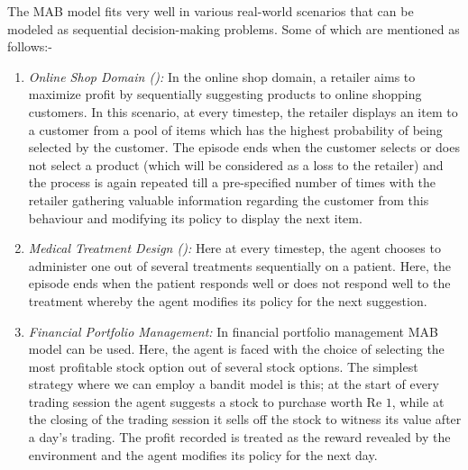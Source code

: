 
The MAB model fits very well in various real-world scenarios that can be modeled as sequential decision-making problems. Some of which are mentioned as follows:-
\begin{enumerate}
\item \emph{Online Shop Domain (\cite{ghavamzadeh2015bayesian}):} In the online shop domain, a retailer aims to maximize profit by sequentially suggesting products to online shopping customers. In this scenario, at every timestep, the retailer displays an item to a customer from a pool of items which has the highest probability of being selected by the customer. The episode ends when the customer selects or does not select a product (which will be considered as a loss to the retailer) and the process is again repeated till a pre-specified number of times with the retailer gathering valuable information regarding the customer from this behaviour and modifying its policy to display the next item.
\item \emph{Medical Treatment Design (\cite{thompson1933likelihood}):} Here at every timestep, the agent chooses to administer one out of several treatments sequentially on a patient. Here, the episode ends when the patient responds well or does not respond well to the treatment whereby the agent modifies its policy for the next suggestion.
\item \emph{Financial Portfolio Management:} In financial portfolio management MAB model can be used. Here, the agent is faced with the choice of selecting the most profitable stock option out of several stock options. The simplest strategy where we can employ a bandit model is this; at the start of every trading session the agent suggests a stock to purchase worth Re $1$, while at the closing of the trading session it sells off the stock to witness its value after a day's trading. The  profit recorded is treated as the reward revealed by the environment and the agent modifies its policy for the next day.
\end{enumerate}

